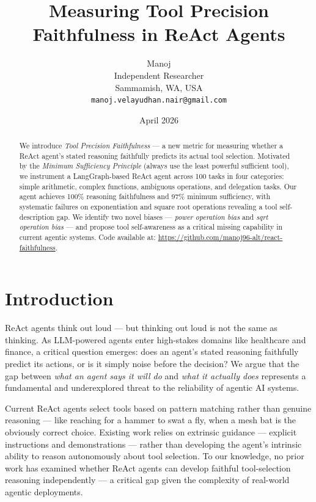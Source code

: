 \documentclass{article}
\title{\textbf{Measuring Tool Precision Faithfulness in ReAct Agents}}
\author{Manoj\\Independent Researcher\\Sammamish, WA, USA\\\texttt{manoj.velayudhan.nair@gmail.com}}
\date{April 2026}
\begin{document}
\maketitle

\begin{abstract}
We introduce \textit{Tool Precision Faithfulness} --- a new metric for measuring whether a ReAct agent's stated reasoning faithfully predicts its actual tool selection. Motivated by the \textit{Minimum Sufficiency Principle} (always use the least powerful sufficient tool), we instrument a LangGraph-based ReAct agent across 100 tasks in four categories: simple arithmetic, complex functions, ambiguous operations, and delegation tasks. Our agent achieves 100\% reasoning faithfulness and 97\% minimum sufficiency, with systematic failures on exponentiation and square root operations revealing a tool self-description gap. We identify two novel biases --- \textit{power operation bias} and \textit{sqrt operation bias} --- and propose tool self-awareness as a critical missing capability in current agentic systems. Code available at: \url{https://github.com/manoj96-alt/react-faithfulness}.
\end{abstract}

\section{Introduction}

ReAct agents think out loud --- but thinking out loud is not the same as thinking. As LLM-powered agents enter high-stakes domains like healthcare and finance, a critical question emerges: does an agent's stated reasoning faithfully predict its actions, or is it simply noise before the decision? We argue that the gap between \textit{what an agent says it will do} and \textit{what it actually does} represents a fundamental and underexplored threat to the reliability of agentic AI systems.

Current ReAct agents select tools based on pattern matching rather than genuine reasoning --- like reaching for a hammer to swat a fly, when a mesh bat is the obviously correct choice. Existing work relies on extrinsic guidance --- explicit instructions and demonstrations --- rather than developing the agent's intrinsic ability to reason autonomously about tool selection. To our knowledge, no prior work has examined whether ReAct agents can develop faithful tool-selection reasoning independently --- a critical gap given the complexity of real-world agentic deployments.
\end{document}
